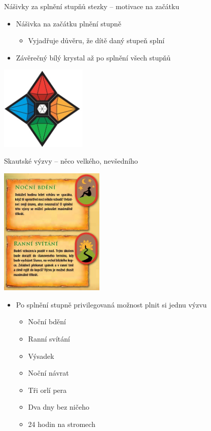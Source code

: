\documentclass[compress,xelatex,xcolor=dvipsnames,print]{beamer}
\begin{document}
\begin{frame}{Nášivky za splnění stupňů stezky -- motivace na začátku}
\begin{itemize}
\item Nášivka na začátku plnění stupně
 \begin{itemize}
 \item Vyjadřuje důvěru, že dítě daný stupeň splní
 \end{itemize}
\item Závěrečný bílý krystal až po splnění všech stupňů
\end{itemize}
\begin{center}
\includegraphics[height=4cm]{kameny.png}
\end{center}
\end{frame}

\begin{frame}{Skautské výzvy -- něco velkého, nevšedního}
\begin{multicols}{2}
\includegraphics[height=6.1cm]{vyzvy.png}
\begin{itemize}
\item Po splnění stupně privilegovaná možnost plnit si jednu výzvu
 \begin{itemize}
 \item Noční bdění
 \item Ranní svítání
 \item Výsadek
 \item Noční návrat
 \item Tři orlí pera
 \item Dva dny bez ničeho
 \item 24 hodin na stromech
 \end{itemize}
\end{itemize}
\end{multicols}
\end{frame}
\end{document}
